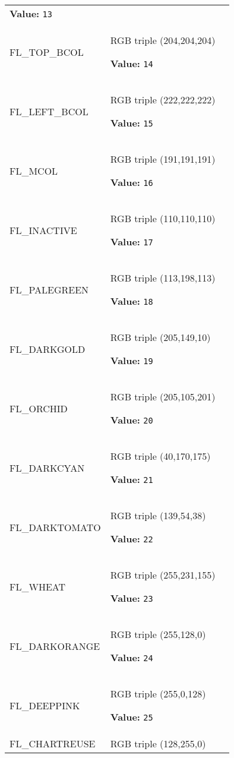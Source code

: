 \begin{longtable}{|p{\varnamewidth}|p{\vardescrwidth}|l}
\textbf{Value:} 
{\tt 13}&\\
\cline{1-2}
\raggedright F\-L\-\_\-T\-O\-P\-\_\-B\-C\-O\-L\- & \raggedright RGB triple (204,204,204)

\textbf{Value:} 
{\tt 14}&\\
\cline{1-2}
\raggedright F\-L\-\_\-L\-E\-F\-T\-\_\-B\-C\-O\-L\- & \raggedright RGB triple (222,222,222)

\textbf{Value:} 
{\tt 15}&\\
\cline{1-2}
\raggedright F\-L\-\_\-M\-C\-O\-L\- & \raggedright RGB triple (191,191,191)

\textbf{Value:} 
{\tt 16}&\\
\cline{1-2}
\raggedright F\-L\-\_\-I\-N\-A\-C\-T\-I\-V\-E\- & \raggedright RGB triple (110,110,110)

\textbf{Value:} 
{\tt 17}&\\
\cline{1-2}
\raggedright F\-L\-\_\-P\-A\-L\-E\-G\-R\-E\-E\-N\- & \raggedright RGB triple (113,198,113)

\textbf{Value:} 
{\tt 18}&\\
\cline{1-2}
\raggedright F\-L\-\_\-D\-A\-R\-K\-G\-O\-L\-D\- & \raggedright RGB triple (205,149,10)

\textbf{Value:} 
{\tt 19}&\\
\cline{1-2}
\raggedright F\-L\-\_\-O\-R\-C\-H\-I\-D\- & \raggedright RGB triple (205,105,201)

\textbf{Value:} 
{\tt 20}&\\
\cline{1-2}
\raggedright F\-L\-\_\-D\-A\-R\-K\-C\-Y\-A\-N\- & \raggedright RGB triple (40,170,175)

\textbf{Value:} 
{\tt 21}&\\
\cline{1-2}
\raggedright F\-L\-\_\-D\-A\-R\-K\-T\-O\-M\-A\-T\-O\- & \raggedright RGB triple (139,54,38)

\textbf{Value:} 
{\tt 22}&\\
\cline{1-2}
\raggedright F\-L\-\_\-W\-H\-E\-A\-T\- & \raggedright RGB triple (255,231,155)

\textbf{Value:} 
{\tt 23}&\\
\cline{1-2}
\raggedright F\-L\-\_\-D\-A\-R\-K\-O\-R\-A\-N\-G\-E\- & \raggedright RGB triple (255,128,0)

\textbf{Value:} 
{\tt 24}&\\
\cline{1-2}
\raggedright F\-L\-\_\-D\-E\-E\-P\-P\-I\-N\-K\- & \raggedright RGB triple (255,0,128)

\textbf{Value:} 
{\tt 25}&\\
\cline{1-2}
\raggedright F\-L\-\_\-C\-H\-A\-R\-T\-R\-E\-U\-S\-E\- & \raggedright RGB triple (128,255,0)


\end{longtable}
